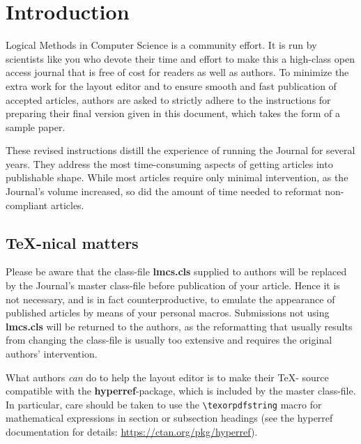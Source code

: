 \documentclass{lmcs} %
\theoremstyle{plain}\newtheorem{satz}[thm]{Satz} %
\begin{document}
\maketitle

\section*{Introduction}\label{S:one}

  Logical Methods in Computer Science is a community effort. It is run
  by scientists like you who devote their time and effort to make this
  a high-class open access journal that is free of cost for readers
  as well as authors.  To minimize the extra work for the layout
  editor and to ensure smooth and fast publication of accepted
  articles, authors are asked to strictly adhere to the instructions
  for preparing their final version given in this document, which
  takes the form of a sample paper.

  These revised instructions distill the experience of running the
  Journal for several years.  They address the most time-consuming
  aspects of getting articles into publishable shape.  While most
  articles require only minimal intervention, as the Journal's volume
  increased, so did the amount of time needed to reformat
  non-compliant articles.

\subsection*{\TeX-nical matters}

  Please be aware that the class-file {\bf lmcs.cls} supplied to
  authors will be replaced by the Journal's master class-file before
  publication of your article.  Hence it is not necessary, and is in
  fact counterproductive, to emulate the appearance of published
  articles by means of your personal macros.  Submissions not using
  {\bf lmcs.cls} will be returned to the authors, as the reformatting
  that usually results from changing the class-file is usually too
  extensive and requires the original authors' intervention.

  What authors \emph{can} do to help the layout editor is to make
  their \TeX- source compatible with the {\bf hyperref}-package, which
  is included by the master class-file.  In particular, care should be
  taken to use the \texttt{\textbackslash texorpdfstring} macro for
  mathematical expressions in section or subsection headings (see the hyperref
  documentation for details: \url{https://ctan.org/pkg/hyperref}).
\end{document}

